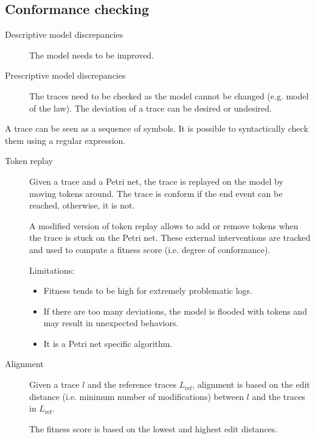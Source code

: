 \subsection{Conformance checking}

\begin{description}
    \item[Descriptive model discrepancies] 
        The model needs to be improved.

    \item[Prescriptive model discrepancies] 
        The traces need to be checked as the model cannot be changed (e.g. model of the law).
        The deviation of a trace can be desired or undesired.
\end{description}

\begin{remark}
    A trace can be seen as a sequence of symbols. It is possible to syntactically check them using a regular expression.
\end{remark}

\begin{description}
    \item[Token replay] 
        Given a trace and a Petri net, the trace is replayed on the model by moving tokens around.
        The trace is conform if the end event can be reached, otherwise, it is not.

        A modified version of token replay allows to add or remove tokens when the trace is stuck on the Petri net. 
        These external interventions are tracked and used to compute a fitness score (i.e. degree of conformance).

        Limitations:
        \begin{itemize}
            \item Fitness tends to be high for extremely problematic logs.
            \item If there are too many deviations, the model is flooded with tokens and may result in unexpected behaviors.
            \item It is a Petri net specific algorithm.
        \end{itemize}

    \item[Alignment] 
        Given a trace $l$ and the reference traces $L_\text{ref}$, 
        alignment is based on the edit distance (i.e. minimum number of modifications) between $l$ and the traces in $L_\text{ref}$.

        The fitness score is based on the lowest and highest edit distances.
\end{description}